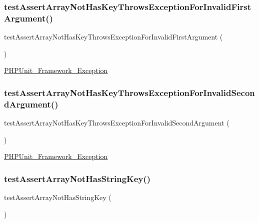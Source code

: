 \subsubsection{\texorpdfstring{test\+Assert\+Array\+Not\+Has\+Key\+Throws\+Exception\+For\+Invalid\+First\+Argument()}{testAssertArrayNotHasKeyThrowsExceptionForInvalidFirstArgument()}}
{\footnotesize\ttfamily test\+Assert\+Array\+Not\+Has\+Key\+Throws\+Exception\+For\+Invalid\+First\+Argument (\begin{DoxyParamCaption}{ }\end{DoxyParamCaption})}

\mbox{\hyperlink{class_p_h_p_unit___framework___exception}{P\+H\+P\+Unit\+\_\+\+Framework\+\_\+\+Exception}} \mbox{\label{class_framework___assert_test_aad310e90e6ea0c9d03709e05ee5727b8}} 
\subsubsection{\texorpdfstring{test\+Assert\+Array\+Not\+Has\+Key\+Throws\+Exception\+For\+Invalid\+Second\+Argument()}{testAssertArrayNotHasKeyThrowsExceptionForInvalidSecondArgument()}}
{\footnotesize\ttfamily test\+Assert\+Array\+Not\+Has\+Key\+Throws\+Exception\+For\+Invalid\+Second\+Argument (\begin{DoxyParamCaption}{ }\end{DoxyParamCaption})}

\mbox{\hyperlink{class_p_h_p_unit___framework___exception}{P\+H\+P\+Unit\+\_\+\+Framework\+\_\+\+Exception}} \mbox{\label{class_framework___assert_test_a602dd4fb0b16db958f77443b78530bef}} 
\subsubsection{\texorpdfstring{test\+Assert\+Array\+Not\+Has\+String\+Key()}{testAssertArrayNotHasStringKey()}}
{\footnotesize\ttfamily test\+Assert\+Array\+Not\+Has\+String\+Key (\begin{DoxyParamCaption}{ }\end{DoxyParamCaption})}

